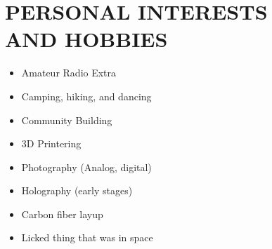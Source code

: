 \documentclass[line,mmmargin]{res}
\begin{document}
\begin{resume}
\begin{multicols}{2}
\begin{itemize}
			\end{itemize}
		\end{multicols}

\section{PERSONAL INTERESTS \\ AND HOBBIES}             
				\begin{multicols}{2}
					\begin{itemize}
						\itemsep -2pt
	\item[]Amateur Radio Extra
	\item[]Camping, hiking, and dancing
	\item[]Community Building
	\item[]3D Printering
	\item[]Photography (Analog, digital)
	\item[]Holography (early stages)
	\item[]Carbon fiber layup
	\item[]Licked thing that was in space

	\end{itemize}
	\end{multicols}


\end{resume}
\end{document}
